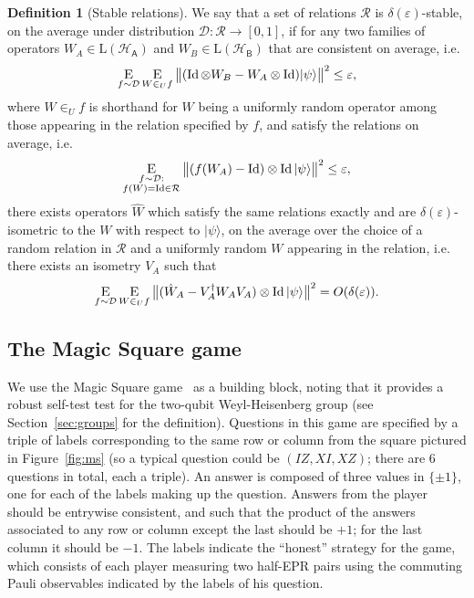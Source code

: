 \documentclass[11pt]{article}
\theoremstyle{remark}
\theoremstyle{definition}
\newtheorem{definition}[theorem]{Definition}
\newcommand{\ket}[1]{|#1\rangle}
\newcommand{\Id}{\ensuremath{\mathop{\rm Id}\nolimits}}
\newcommand{\Es}[1]{\ensuremath{\mathop{\textsc{E}}_{#1}}}
\newcommand{\reg}[1]{{\textsf{#1}}}
\newcommand{\mH}{\mathcal{H}}
\newcommand{\setft}[1]{\mathrm{#1}}
\newcommand{\Lin}{\setft{L}}
\newcommand{\eps}{\varepsilon}
\begin{document}
\begin{definition}[Stable relations]
We say that a set of relations $\mathcal{R}$ is $\delta(\eps)$-stable, on the average under distribution $\mathcal{D}:\mathcal{R}\to[0,1]$, if for any two families of operators $W_A\in\Lin(\mH_\reg{A})$ and  $W_B\in\Lin(\mH_\reg{B})$ that are consistent on average, i.e. 
$$\Es{f \sim\mathcal{D}} \Es{W \in_U f} \big\| (\Id\otimes W_B - W_A \otimes \Id)\ket{\psi}\big\|^2\leq \eps,$$
where $W \in_U f$ is shorthand for $W$ being a uniformly random operator among those appearing in the relation specified by $f$,
and satisfy the relations on average, i.e. 
$$\Es{\substack{f\sim\mathcal{D}:\\f(W)=\Id \in\mathcal{R}}} \big\|  (f(W_A)- \Id) \otimes \Id \ket{\psi}\big\|^2 \leq \eps,$$
  there exists operators $\hat{W}$ which satisfy the same relations exactly and are $\delta(\eps)$-isometric to the $W$ with respect to $\ket{\psi}$, on the average over the choice of a random relation in $\mathcal{R}$ and a uniformly random $W$ appearing in the relation, i.e. there exists an isometry $V_A$ such that 
  \begin{equation}
    \Es{f \sim\mathcal{D}} \Es{W \in_U f} \big\|( \hat{W}_A-V_A^\dagger W_AV_A)\otimes \Id \ket{\psi}\big\|^2=O(\delta(\eps)).\nonumber
  \end{equation}
	\end{definition}

\subsection{The Magic Square game}
\label{sec:ms}

We use the Magic Square game~\cite{Mermin90} as a building block, noting that it  provides a robust self-test test for the two-qubit Weyl-Heisenberg group (see Section~\ref{sec:groups} for the definition). Questions in this game are specified by a triple of labels corresponding to the same row or column from the square pictured in Figure~\ref{fig:ms} (so a typical question could be $(IZ,XI,XZ)$; there are $6$ questions in total, each a triple). An answer is composed of three values in $\{\pm 1\}$, one for each of the labels making up the question. Answers from the player should be entrywise consistent, and such that the product of the answers associated to any row or column except the last should be $+1$; for the last column it should be $-1$. The labels indicate the ``honest'' strategy for the game, which consists of each player measuring two half-EPR pairs using the commuting Pauli observables indicated by the labels of his question. 
\end{document}
